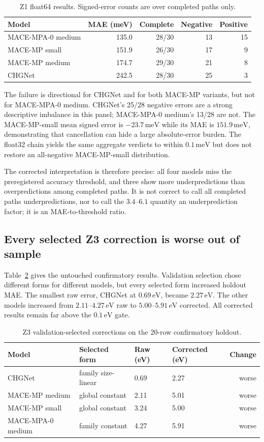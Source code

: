 \documentclass[11pt]{article}
\newcommand{\eV}{\,\mathrm{eV}}
\newcommand{\meV}{\,\mathrm{meV}}
\begin{document}
\begin{table}[htbp]
\centering
\caption{Z1 float64 results. Signed-error counts are over completed paths only.}
\label{tab:z1}
\begin{tabular}{lrrrr}
\toprule
Model & MAE (meV) & Complete & Negative & Positive \\
\midrule
MACE-MPA-0 medium & 135.0 & 28/30 & 13 & 15 \\
MACE-MP small     & 151.9 & 26/30 & 17 & 9 \\
MACE-MP medium    & 174.7 & 29/30 & 21 & 8 \\
CHGNet            & 242.5 & 28/30 & 25 & 3 \\
\bottomrule
\end{tabular}
\end{table}

The failure is directional for CHGNet and for both MACE-MP variants, but not for MACE-MPA-0 medium. CHGNet's 25/28 negative errors are a strong descriptive imbalance in this panel; MACE-MPA-0 medium's 13/28 are not. The MACE-MP-small mean signed error is $-23.7\meV$ while its MAE is $151.9\meV$, demonstrating that cancellation can hide a large absolute-error burden. The float32 chain yields the same aggregate verdicts to within $0.1\meV$ but does not restore an all-negative MACE-MP-small distribution.

The corrected interpretation is therefore precise: all four models miss the preregistered accuracy threshold, and three show more underpredictions than overpredictions among completed paths. It is not correct to call all completed paths underpredictions, nor to call the $3.4$--$6.1$ quantity an underprediction factor; it is an MAE-to-threshold ratio.

\subsection{Every selected Z3 correction is worse out of sample}

Table~\ref{tab:z3} gives the untouched confirmatory results. Validation selection chose different forms for different models, but every selected form increased holdout MAE. The smallest raw error, CHGNet at $0.69\eV$, became $2.27\eV$. The other models increased from $2.11$--$4.27\eV$ raw to $5.00$--$5.91\eV$ corrected. All corrected results remain far above the $0.1\eV$ gate.

\begin{table}[htbp]
\centering
\caption{Z3 validation-selected corrections on the 20-row confirmatory holdout.}
\label{tab:z3}
\begin{tabular}{llllr}
\toprule
Model & Selected form & Raw (eV) & Corrected (eV) & Change \\
\midrule
CHGNet & family size-linear & 0.69 & 2.27 & worse \\
MACE-MP medium & global constant & 2.11 & 5.01 & worse \\
MACE-MP small & global constant & 3.24 & 5.00 & worse \\
MACE-MPA-0 medium & family constant & 4.27 & 5.91 & worse \\
\bottomrule
\end{tabular}
\end{table}
\end{document}
